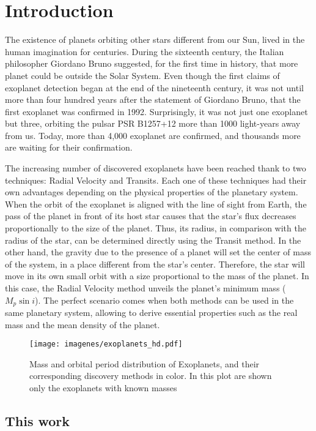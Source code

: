 \chapter{Introduction}\label{chap:intro}
The existence of planets orbiting other stars different from our Sun, lived in the human imagination for centuries. During the sixteenth century, the Italian philosopher Giordano Bruno suggested, for the first time in history, that more planet could be outside the Solar System. Even though the first claims of exoplanet detection began at the end of the nineteenth century, it was not until more than four hundred years after the statement of Giordano Bruno, that the first exoplanet was confirmed in 1992. Surprisingly, it was not just one exoplanet but three, orbiting the pulsar PSR B1257+12 more than 1000 light-years away from us. Today, more than 4,000 exoplanet are confirmed, and thousands more are waiting for their confirmation.

The increasing number of discovered exoplanets have been reached thank to two techniques: Radial Velocity and Transits. Each one of these techniques had their own advantages depending on the physical properties of the planetary system. When the orbit of the exoplanet is aligned with the line of sight from Earth, the pass of the planet in front of its host star causes that the star's flux decreases proportionally to the size of the planet. Thus, its radius, in comparison with the radius of the star, can be determined directly using the Transit method. In the other hand, the gravity due to the presence of a planet will set the center of mass of the system, in a place different from the star's center. Therefore, the star will move in its own small orbit with a size proportional to the mass of the planet. In this case, the Radial Velocity method unveils the planet's minimum mass ($M_{p}\sin i$). The perfect scenario comes when both methods can be used in the same planetary system, allowing to derive essential properties such as the real mass and the mean density of the planet.

\begin{figure}[H]
\centering
\texttt{[image: imagenes/exoplanets\_hd.pdf]}
\caption{Mass and orbital period distribution of Exoplanets, and their corresponding discovery methods in color. In this plot are shown only the exoplanets with known masses}
\label{exoplanets}
\end{figure}

\section{This work}

